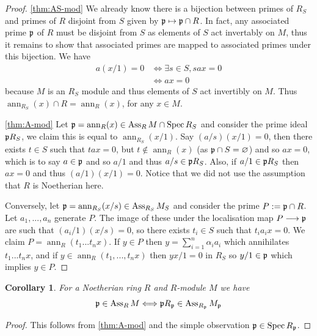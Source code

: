 \documentclass[12pt]{article}
\theoremstyle{plain}
\newtheorem{cor}[thm]{Corollary}
\theoremstyle{definition}
\newcommand{\lto}{\longrightarrow}
\begin{document}
\begin{proof}
\eqref{thm:AS-mod} We already know there is a bijection between primes of $R_S$ and primes of $R$ disjoint from $S$ given by $\frak{p} \mapsto \frak{p} \cap R$. In fact, any associated prime $\frak{p}$ of $R$ must be disjoint from $S$ as elements of $S$ act invertably on $M$, thus it remains to show that associated primes are mapped to associated primes under this bijection. We have
\begin{align*}
    a(x/1) = 0 &\Leftrightarrow \exists s \in S,\text{}sax = 0\\
    &\Leftrightarrow ax = 0
\end{align*}
because $M$ is an $R_S$ module and thus elements of $S$ act invertibly on $M$. Thus $\operatorname{ann}_{R_S}(x) \cap R = \operatorname{ann}_{R}(x)$, for any $x \in M$.

\eqref{thm:A-mod} Let $\frak{p} = \operatorname{ann}_R(x) \in \operatorname{Ass}_RM \cap \operatorname{Spec}R_S$ and consider the prime ideal $\frak{p}R_S$, we claim this is equal to $\operatorname{ann}_{R_S}(x/1)$. Say $(a/s)(x/1) = 0$, then there exists $t \in S$ such that $tax = 0$, but $t \not\in \operatorname{ann}_R(x)$ (as $\frak{p} \cap S = \varnothing$) and so $ax = 0$, which is to say $a \in \frak{p}$ and so $a/1$ and thus $a/s \in \frak{p}R_S$. Also, if $a/1 \in \frak{p}R_S$ then $ax = 0$ and thus $(a/1)(x/1) = 0$. Notice that we did not use the assumption that $R$ is Noetherian here.

Conversely, let $\frak{p} = \operatorname{ann}_{R_S}(x/s) \in \operatorname{Ass}_{R_S}M_S$ and consider the prime $P := \frak{p} \cap R$. Let $a_1,...,a_n$ generate $P$. The image of these under the localisation map $P \lto \frak{p}$ are such that $(a_i/1)(x/s) = 0$, so there exists $t_i \in S$ such that $t_i a_i x = 0$. We claim $P = \operatorname{ann}_R(t_1...t_nx)$. If $y \in P$ then $y = \sum_{i = 1}^n \alpha_i a_i$ which annihilates $t_1...t_nx$, and if $y \in \operatorname{ann}_R(t_1,...,t_nx)$ then $yx/1 = 0$ in $R_S$ so $y/1 \in \frak{p}$ which implies $y \in P$.
\end{proof}
\begin{cor}
\label{cor:ass_R,ass_Rp}
For a Noetherian ring $R$ and $R$-module $M$ we have
\[\frak{p} \in \operatorname{Ass}_RM \Longleftrightarrow \frak{p}R_\frak{p} \in \operatorname{Ass}_{R_\frak{p}}M_{\frak{p}}\]
\end{cor}
\begin{proof}
This follows from \eqref{thm:A-mod} and the simple observation $\frak{p} \in \operatorname{Spec}R_{\frak{p}}$.
\end{proof}
\end{document}
